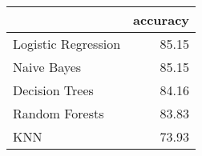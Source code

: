 \begin{tabular}{lr}
\toprule
{} &  accuracy \\
\midrule
Logistic Regression &     85.15 \\
Naive Bayes         &     85.15 \\
Decision Trees      &     84.16 \\
Random Forests      &     83.83 \\
KNN                 &     73.93 \\
\bottomrule
\end{tabular}


